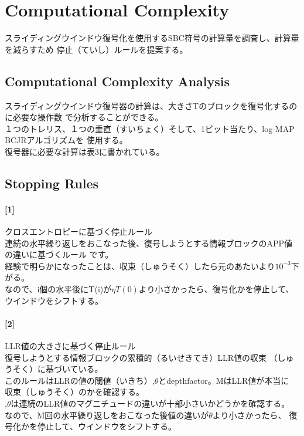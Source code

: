 \documentclass[20 pts]{article}
\begin{document}
\section{Computational Complexity}
スライディングウインドウ復号化を使用するSBC符号の計算量を調査し、計算量を減らすため
停止（ていし）ルールを提案する。\\
\subsection{Computational Complexity Analysis}
スライディングウインドウ復号器の計算は、大きさTのブロックを復号化するのに必要な操作数
で分析することができる。\\

１つのトレリス、１つの垂直（すいちょく）そして、1ビット当たり、log-MAP BCJRアルゴリズムを
使用する。\\
復号器に必要な計算は表3に書かれている。

\subsection{Stopping Rules}

\paragraph{[1]}クロスエントロピーに基づく停止ルール\\
連続の水平繰り返しをおこなった後、復号しようとする情報ブロックのAPP値の違いに基づくルール
です。\\


経験で明らかになったことは、収束（しゅうそく）したら元のあたいより$10^{-3}$下がる。\\

なので、i個の水平後にT(i)が$\eta T(0)$より小さかったら、復号化かを停止して、
ウインドウをシフトする。\\

\paragraph{[2]}LLR値の大きさに基づく停止ルール\\
復号しようとする情報ブロックの累積的（るいせきてき）LLR値の収束
（しゅうそく）に基づいている。\\


このルールはLLRの値の閾値（いきち）,$\theta$とdepthfactor。MはLLR値が本当に
収束（しゅうそく）のかを確認する。\\

,$\theta$は連続のLLR値のマグニチュードの違いが十部小さいかどうかを確認する。\\

なので、M回の水平繰り返しをおこなった後値の違いが$\theta$より小さかったら、
復号化かを停止して、ウインドウをシフトする。\\
\end{document}
